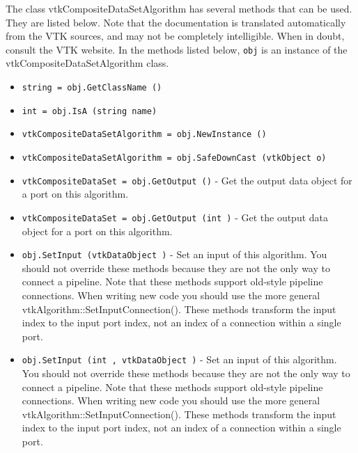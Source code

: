 The class vtkCompositeDataSetAlgorithm has several methods that can be used.
  They are listed below.
Note that the documentation is translated automatically from the VTK sources,
and may not be completely intelligible.  When in doubt, consult the VTK website.
In the methods listed below, \verb|obj| is an instance of the vtkCompositeDataSetAlgorithm class.
\begin{itemize}
\item  \verb|string = obj.GetClassName ()|

\item  \verb|int = obj.IsA (string name)|

\item  \verb|vtkCompositeDataSetAlgorithm = obj.NewInstance ()|

\item  \verb|vtkCompositeDataSetAlgorithm = obj.SafeDownCast (vtkObject o)|

\item  \verb|vtkCompositeDataSet = obj.GetOutput ()| -  Get the output data object for a port on this algorithm.

\item  \verb|vtkCompositeDataSet = obj.GetOutput (int )| -  Get the output data object for a port on this algorithm.

\item  \verb|obj.SetInput (vtkDataObject )| -  Set an input of this algorithm. You should not override these
 methods because they are not the only way to connect a pipeline.
 Note that these methods support old-style pipeline connections.
 When writing new code you should use the more general
 vtkAlgorithm::SetInputConnection().  These methods transform the
 input index to the input port index, not an index of a connection
 within a single port.

\item  \verb|obj.SetInput (int , vtkDataObject )| -  Set an input of this algorithm. You should not override these
 methods because they are not the only way to connect a pipeline.
 Note that these methods support old-style pipeline connections.
 When writing new code you should use the more general
 vtkAlgorithm::SetInputConnection().  These methods transform the
 input index to the input port index, not an index of a connection
 within a single port.

\end{itemize}
